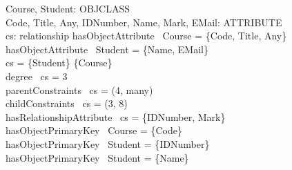 \documentclass{entcs}
\begin{document}
\begin{small}
\begin{axdef}
  Course, Student: OBJCLASS\\
  Code, Title, Any, IDNumber, Name, Mark, EMail: ATTRIBUTE\\
  cs: relationship
\where
  hasObjectAttribute~ Course = \{Code, Title, Any\}\\
  hasObjectAttribute~ Student = \{Name, EMail\}\\
  cs = \{Student\} \mapsto  \langle \{Course\}\rangle \\
  degree~ cs = 3\\
  parentConstraints~ cs = (4, many)\\
  childConstraints~ cs = (3, 8)\\
  hasRelationshipAttribute~ cs = \{IDNumber, Mark\}\\
  hasObjectPrimaryKey~ Course = \{Code\}\\
  hasObjectPrimaryKey~ Student = \{IDNumber\}\\
  hasObjectPrimaryKey~ Student = \{Name\}
\end{axdef}
\end{small}
\end{document}
